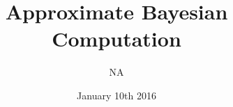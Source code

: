 \titlepage
\title{Approximate Bayesian Computation}
\author{NA}
\date{January 10th 2016}
\maketitle

